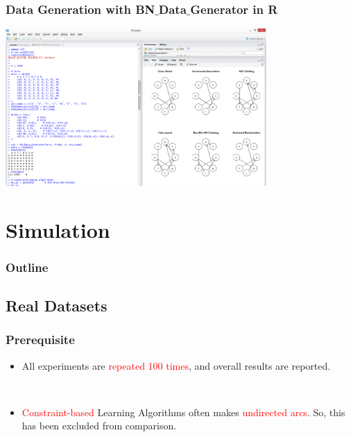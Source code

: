 \documentclass{beamer}
\begin{document}
\begin{frame}
\frametitle{Data Generation with BN$\_$Data$\_$Generator in R}
{\scriptsize{}
	\begin{center}
		\includegraphics[height=170pt]{images/image23}
	\end{center}
}
\end{frame}


\section{Simulation}

\begin{frame}
\frametitle{Outline}
{\scriptsize{}
	\tableofcontents[currentsection]
}
\end{frame}


\subsection{Real Datasets}



\begin{frame}
\frametitle{Prerequisite}
{\scriptsize{}
	\begin{itemize}
		\item All experiments are \textcolor{red}{repeated 100 times}, and overall results are reported.
		
		{}\		
		
		\item \textcolor{red}{Constraint-based} Learning Algorithms often makes \textcolor{red}{undirected arcs}. So, this has been excluded from comparison.
		
	\end{itemize}
}
\end{frame}
\end{document}
